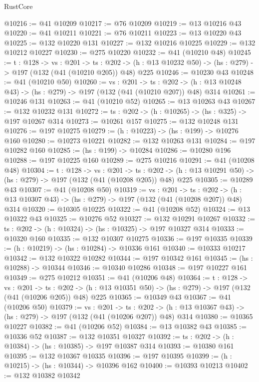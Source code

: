 \begin{lexlean}{RustCore}
\begin{coremodule}
@10216 := @41 @10209
@10217 := @76 @10209
@10219 := @13 @10216 @43
@10220 := @41 @10211
@10221 := @76 @10211
@10223 := @13 @10220 @43
@10225 := @132 @10220 @131
@10227 := @132 @10216 @10225
@10229 := @132 @10212 @10227
@10230 := @275 @10220
@10232 := @41 (@10210 @48)
@10245 := {t : @128} ->
  {vs : @201} ->
  {ts : @202} -> (h : @13 @10232 @50) -> (hs : @279) -> @197 (@132 (@41 (@10210 @205)) @48) @225
@10246 := @10230 @43
@10248 := @41 (@10210 @50)
@10260 := {vs : @201} ->
  {ts : @202} -> (h : @13 @10248 @43) -> (hs : @279) -> @197 (@132 (@41 (@10210 @207)) @48) @314
@10261 := @10246 @131
@10263 := @41 (@10210 @52)
@10265 := @13 @10263 @43
@10267 := @132 @10232 @131
@10272 := {ts : @202} -> (h : @10265) -> (hs : @325) -> @197 @10267 @314
@10273 := @10261 @157
@10275 := @132 @10248 @131
@10276 := @197 @10275
@10279 := (h : @10223) -> (hs : @199) -> @10276 @160
@10280 := @10273 @10221
@10282 := @132 @10263 @131
@10284 := @197 @10282 @160
@10285 := (hs : @199) -> @10284
@10286 := @10280 @196
@10288 := @197 @10225 @160
@10289 := @275 @10216
@10291 := @41 (@10208 @48)
@10304 := {t : @128} ->
  {vs : @201} ->
  {ts : @202} -> (h : @13 @10291 @50) -> (hs : @279) -> @197 (@132 (@41 (@10208 @205)) @48) @225
@10305 := @10289 @43
@10307 := @41 (@10208 @50)
@10319 := {vs : @201} ->
  {ts : @202} -> (h : @13 @10307 @43) -> (hs : @279) -> @197 (@132 (@41 (@10208 @207)) @48) @314
@10320 := @10305 @10225
@10322 := @41 (@10208 @52)
@10324 := @13 @10322 @43
@10325 := @10276 @52
@10327 := @132 @10291 @10267
@10332 := {ts : @202} -> (h : @10324) -> (hs : @10325) -> @197 @10327 @314
@10333 := @10320 @160
@10335 := @132 @10307 @10275
@10336 := @197 @10335
@10339 := (h : @10219) -> (hs : @10284) -> @10336 @161
@10340 := @10333 @10217
@10342 := @132 @10322 @10282
@10344 := @197 @10342 @161
@10345 := (hs : @10288) -> @10344
@10346 := @10340 @10286
@10348 := @197 @10227 @161
@10349 := @275 @10212
@10351 := @41 (@10206 @48)
@10364 := {t : @128} ->
  {vs : @201} ->
  {ts : @202} -> (h : @13 @10351 @50) -> (hs : @279) -> @197 (@132 (@41 (@10206 @205)) @48) @225
@10365 := @10349 @43
@10367 := @41 (@10206 @50)
@10379 := {vs : @201} ->
  {ts : @202} -> (h : @13 @10367 @43) -> (hs : @279) -> @197 (@132 (@41 (@10206 @207)) @48) @314
@10380 := @10365 @10227
@10382 := @41 (@10206 @52)
@10384 := @13 @10382 @43
@10385 := @10336 @52
@10387 := @132 @10351 @10327
@10392 := {ts : @202} -> (h : @10384) -> (hs : @10385) -> @197 @10387 @314
@10393 := @10380 @161
@10395 := @132 @10367 @10335
@10396 := @197 @10395
@10399 := (h : @10215) -> (hs : @10344) -> @10396 @162
@10400 := @10393 @10213
@10402 := @132 @10382 @10342

\end{coremodule}
\end{lexlean}
